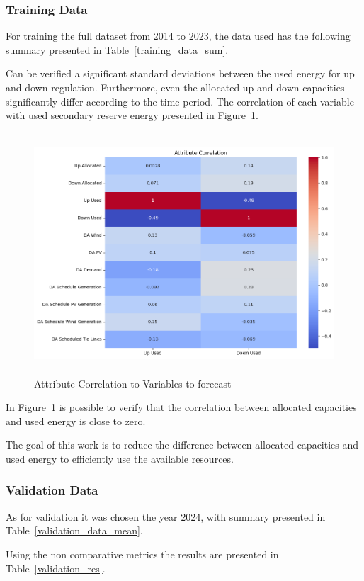 \subsubsection{Training Data}
For training the full dataset from 2014 to 2023, the data used has the following summary presented in Table~\ref{training_data_sum}.



Can be verified a significant standard deviations between the used energy for up and down regulation. Furthermore, even the allocated up and down capacities significantly differ according to the time period. 
%
The correlation of each variable with used secondary reserve energy presented in Figure~\ref{fig:Attribute_correlation}.

\begin{figure}[H]
    \centering
    \includegraphics[height=9cm, keepaspectratio=true]{plots/correlation_heatmap.png}
    \caption{Attribute Correlation to Variables to forecast}
    \label{fig:Attribute_correlation}
  \end{figure}
  
 In Figure~\ref{fig:Attribute_correlation} is possible to verify that the correlation between allocated capacities and used energy is close to zero.  
  
The goal of this work is to reduce the difference between allocated capacities and used energy to efficiently use the available resources.

\subsubsection{Validation Data}
As for validation it was chosen the year 2024, with summary presented in Table~\ref{validation_data_mean}.\par

Using the non comparative metrics the results are presented in Table~\ref{validation_res}.

